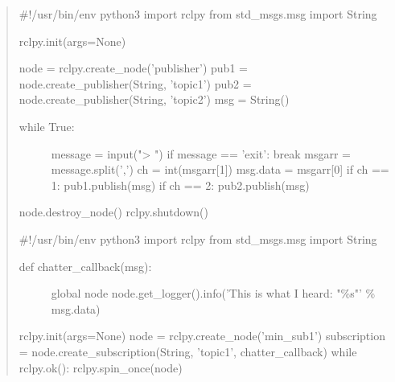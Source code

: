 \begin{quote}
\#!/usr/bin/env python3 import rclpy from std\_msgs.msg import String

rclpy.init(args=None)

node = rclpy.create\_node('publisher') pub1 =
node.create\_publisher(String, 'topic1') pub2 =
node.create\_publisher(String, 'topic2') msg = String()

\begin{description}
\item[while True:]
message = input("\textgreater{} ") if message == 'exit': break msgarr =
message.split(',') ch = int(msgarr{[}1{]}) msg.data = msgarr{[}0{]} if
ch == 1: pub1.publish(msg) if ch == 2: pub2.publish(msg)
\end{description}

node.destroy\_node() rclpy.shutdown()

\#!/usr/bin/env python3 import rclpy from std\_msgs.msg import String

\begin{description}
\item[def chatter\_callback(msg):]
global node node.get\_logger().info('This is what I heard: "\%s"' \%
msg.data)
\end{description}

rclpy.init(args=None) node = rclpy.create\_node('min\_sub1')
subscription = node.create\_subscription(String, 'topic1',
chatter\_callback) while rclpy.ok(): rclpy.spin\_once(node)
\end{quote}

\begin{Shaded}
\begin{Highlighting}[]

 \OperatorTok{\%}

\OperatorTok{=}\NormalTok{)}
\OperatorTok{=}\NormalTok{)}
\OperatorTok{=}
\end{Highlighting}
\end{Shaded}


